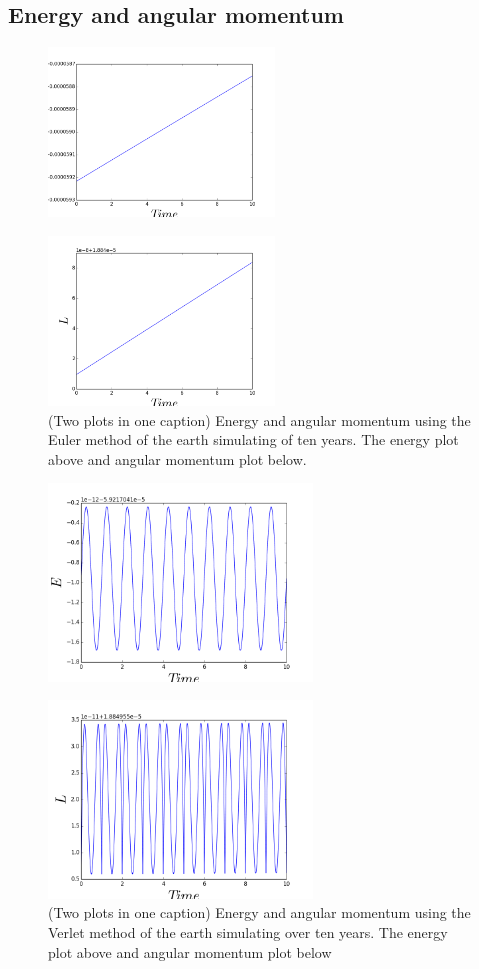 \documentclass[twocolumn]{article}
\begin{document}
\subsection*{Energy and angular momentum}
\begin{figure}[H]
\centering
\includegraphics[width=6cm]{E_euler.png}
\end{figure}
\begin{figure}[H]
\centering
\includegraphics[width=6cm]{ang_euler.png}
\caption{(Two plots in one caption) Energy and angular momentum using the Euler method of the earth simulating of ten years. The energy plot above and angular momentum plot below.}
\end{figure}
\begin{figure}[H]
\centering
\includegraphics[width=7cm]{E_VERLET.png}
\end{figure}
\begin{figure}[H]
\centering
\includegraphics[width=7cm]{ang_verlet.png}
\caption{(Two plots in one caption) Energy and angular momentum using the Verlet method of the earth simulating over ten years. The energy plot above and angular momentum plot below}
\end{figure}
\end{document}
